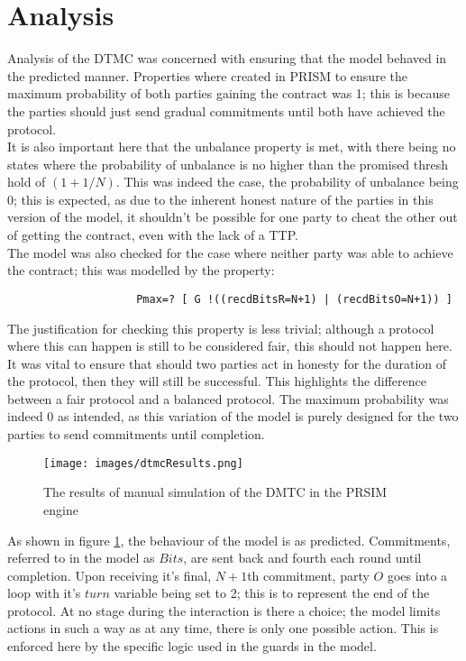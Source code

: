 \documentclass{l4proj}
\begin{document}
\section{Analysis}

Analysis of the DTMC was concerned with ensuring that the model behaved in the predicted manner. Properties where created in PRISM to ensure the maximum probability of both parties gaining the contract was 1; this is because the parties should just send gradual commitments until both have achieved the protocol.\\
It is also important here that the unbalance property is met, with there being no states where the probability of unbalance is no higher than the promised thresh hold of $(1+1/N)$. This was indeed the case, the probability of unbalance being 0; this is expected, as due to the inherent honest nature of the parties in this version of the model, it shouldn't be possible for one party to cheat the other out of getting the contract, even with the lack of a TTP.\\
The model was also checked for the case where neither party was able to achieve the contract; this was modelled by the property:

\begin{lstlisting}
                    Pmax=? [ G !((recdBitsR=N+1) | (recdBitsO=N+1)) ]
\end{lstlisting}

The justification for checking this property is less trivial; although a protocol where this can happen is still to be considered fair, this should not happen here. It was vital to ensure that should two parties act in honesty for the duration of the protocol, then they will still be successful. This highlights the difference between a fair protocol and a balanced protocol. The maximum probability was indeed 0 as intended, as this variation of the model is purely designed for the two parties to send commitments until completion.

\begin{figure}[ht!]
\centering
\texttt{[image: images/dtmcResults.png]}
\caption{The results of manual simulation of the DMTC in the PRSIM engine}
\label{dtmcEx}
\end{figure}

As shown in figure \ref{dtmcEx}, the behaviour of the model is as predicted. Commitments, referred to in the model as $Bits$, are sent back and fourth each round until completion. Upon receiving it's final, $N+1$th commitment, party $O$ goes into a loop with it's $turn$ variable being set to 2; this is to represent the end of the protocol. 
At no stage during the interaction is there a choice; the model limits actions in such a way as at any time, there is only one possible action. This is enforced here by the specific logic used in the guards in the model.
\end{document}
